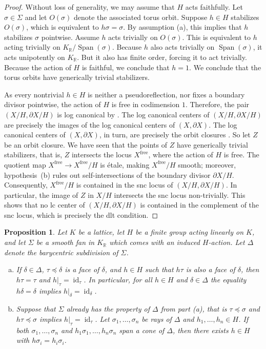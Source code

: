 \documentclass[11pt, a4paper]{amsart}
\newtheorem{proposition}[theorem]{Proposition}
\theoremstyle{definition}
\theoremstyle{myitemstyle}
\newcommand{\R}{\mathbb{R}}
\DeclareMathOperator{\id}{id}
\DeclareMathOperator{\Span}{Span}
\begin{document}
\begin{proof}
Without loss of generality, we may assume that $H$ acts faithfully. Let $\sigma\in \Sigma$ and let $O(\sigma)$ denote the associated torus orbit. Suppose $h\in H$ stabilizes $O(\sigma)$, which is equivalent to $h\sigma=\sigma$. By assumption (a), this implies that $h$ stabilizes $\sigma$ pointwise. Assume $h$ acts trivially on $O(\sigma)$. This is equivalent to $h$ acting trivially on $K_\R/\Span(\sigma)$. Because $h$ also acts trivially on $\Span(\sigma)$, it acts unipotently on $K_\R$. But it also has finite order, forcing it to act trivially. Because the action of $H$ is faithful, we conclude that $h=1$. We conclude that the torus orbits have generically trivial stabilizers.

As every nontrivial $h\in H$ is neither a pseudoreflection, nor fixes a boundary divisor pointwise, the action of $H$ is free in codimension $1$. Therefore, the pair $(X/H,\partial X/H)$ is log canonical by \cite[Proposition 5.20]{KM98}. The log canonical centers of $(X/H,\partial X/H)$ are precisely the images of the log canonical centers of $(X,\partial X)$. The log canonical centers of $(X, \partial X)$, in turn, are precisely the orbit closures \cite[Section 3.9]{Fujino}. So let $Z$ be an orbit closure. We have seen that the points of $Z$ have generically trivial stabilizers, that is, $Z$ intersects the locus $X^{\mathrm{free}}$, where the action of $H$ is free. The quotient map $X^{\mathrm{free}} \to X^{\mathrm{free}}/H$ is étale, making $X^{\mathrm{free}}/H$ smooth; moreover, hypothesis~(b) rules out self-intersections of the boundary divisor $\partial X/H$. Consequently, $X^{\mathrm{free}}/H$ is contained in the snc locus of $(X/H, \partial X/H)$. In particular, the image of $Z$ in $X/H$ intersects the snc locus non-trivially. This shows that no lc center of $(X/H,\partial X/H)$ is contained in the complement of the snc locus, which is precisely the dlt condition. 
\end{proof}

\begin{proposition}
\label{prop:barycentric subdivision}
Let $K$ be a lattice, let $H$ be a finite group acting linearly on $K$, and let $\Sigma$ be a smooth fan in $K_\R$ which comes with  an induced $H$-action. Let $\Delta$ denote the barycentric subdivision of $\Sigma$.
\begin{enumerate}[(a)]
    \item If $\delta\in \Delta$, $\tau\preceq \delta$ is a face of $\delta$, and $h\in H$ such that $h\tau$ is also a face of $\delta$, then $h\tau=\tau$ and $h|_\tau=\id_\tau$. In particular, for all $h\in H$ and $\delta\in \Delta$ the equality $h\delta=\delta$ implies $h|_\delta=\id_\delta$.
    \item Suppose that $\Sigma$ already has the property of $\Delta$ from part (a), that is $\tau\preceq \sigma$ and $h\tau\preceq \sigma$ implies $h|_\tau=\id_\tau$.
    Let $\sigma_1,\ldots , \sigma_n$ be rays of $\Delta$ and $h_1,\ldots, h_n\in H$. If both $\sigma_1,\ldots,\sigma_n$ and $h_1\sigma_1,\ldots,h_n\sigma_n$ span a cone of $\Delta$, then there exists $h\in H$ with $h\sigma_i=h_i\sigma_i$.
\end{enumerate}
\end{proposition}
\end{document}
